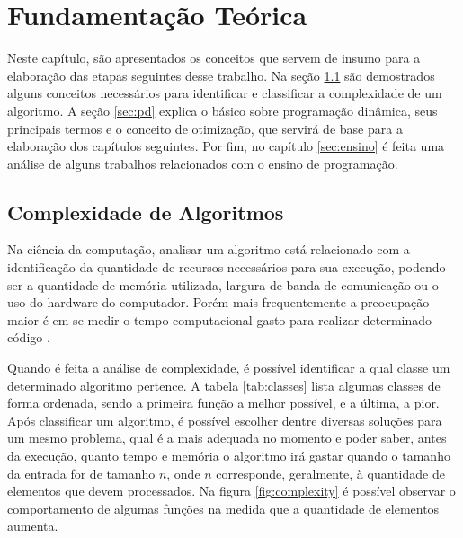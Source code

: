 
\chapter{Fundamentação Teórica}
\label{chap:fundamentacao}

Neste capítulo, são apresentados os conceitos que servem de insumo para a elaboração das etapas seguintes desse trabalho. Na seção \ref{sec:complexidade} são demostrados alguns conceitos necessários para identificar e classificar a complexidade de um algoritmo. A seção \ref{sec:pd} explica o básico sobre programação dinâmica, seus principais termos e o conceito de otimização, que servirá de base para a elaboração dos capítulos seguintes. Por fim, no capítulo \ref{sec:ensino} é feita uma análise de alguns trabalhos relacionados com o ensino de programação.



\section{Complexidade de Algoritmos}
\label{sec:complexidade}
Na ciência da computação, analisar um algoritmo está relacionado com a identificação da quantidade de recursos necessários para sua execução, podendo ser a quantidade de memória utilizada, largura de banda de comunicação ou o uso do hardware do computador. Porém mais frequentemente a preocupação maior é em se medir o tempo computacional gasto para realizar determinado código \cite{Cormen09a}.

Quando é feita a análise de complexidade, é possível identificar a qual classe um determinado algoritmo pertence. A tabela \ref{tab:classes} lista algumas classes de forma ordenada, sendo a primeira função a melhor possível, e a última, a pior. Após classificar um algoritmo, é possível escolher dentre diversas soluções para um mesmo problema, qual é a mais adequada no momento e poder saber, antes da execução, quanto tempo e memória o algoritmo irá gastar quando o tamanho da entrada for de tamanho $n$, onde $n$ corresponde, geralmente, à quantidade de elementos que devem processados. Na figura \ref{fig:complexity} é possível observar o comportamento de algumas funções na medida que a quantidade de elementos aumenta.


